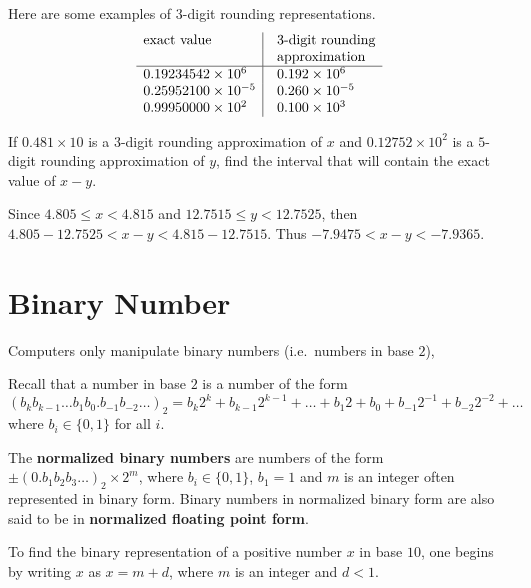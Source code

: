 \begin{egg}
Here are some examples of $3$-digit rounding representations.
\[
\begin{array}{l|@{\hspace{1em}}l}
\text{exact value} & \text{$3$-digit rounding}\\
 & \text{approximation}\\
\hline
0.19234542 \times 10^6 & 0.192 \times 10^6 \\
0.25952100 \times 10^{-5} & 0.260 \times 10^{-5} \\
0.99950000 \times 10^2 & 0.100 \times 10^3
\end{array}
\]
\end{egg}

\begin{egg}
If $0.481\times 10$ is a $3$-digit rounding approximation of $x$ and
$0.12752 \times 10^2$ is a $5$-digit rounding approximation of $y$, find
the interval that will contain the exact value of $x-y$.

Since $4.805 \leq x <4.815$ and $12.7515 \leq y < 12.7525$, then
$4.805-12.7525 <x-y < 4.815-12.7515$.  Thus $-7.9475 < x-y < -7.9365$.
\end{egg}

\section{Binary Number}

Computers only manipulate binary numbers (i.e.\ numbers in base $2$),

Recall that a number in base $2$ is a number of the form
\[
(b_k b_{k-1} \ldots b_1 b_0. b_{-1} b_{-2} \ldots )_2
= b_k 2^k + b_{k-1} 2^{k-1} + \ldots + b_1 2 + b_0 + b_{-1} 2^{-1}
+ b_{-2} 2^{-2} + \ldots
\]
where $b_i \in \{0,1\}$ for all $i$.

\begin{defn}
The {\bfseries normalized binary numbers}
are numbers of the form
$\pm(0.b_1 b_2 b_3 \ldots )_2 \times 2^m$, where $b_i \in \{0,1\}$,
$b_1 = 1$ and $m$ is an integer often represented in binary form. 
Binary numbers in normalized binary form are also said to be in
{\bfseries normalized floating point form}.
\end{defn}

To find the binary representation of a positive number $x$ in base
$10$, one begins by writing $x$ as $x=m+d$, where $m$ is an integer
and $d<1$.


